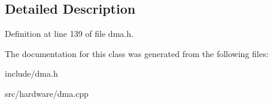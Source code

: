 \subsection{Detailed Description}


Definition at line 139 of file dma.\-h.



The documentation for this class was generated from the following files\-:\begin{DoxyCompactItemize}
\item 
include/dma.\-h\item 
src/hardware/dma.\-cpp\end{DoxyCompactItemize}
